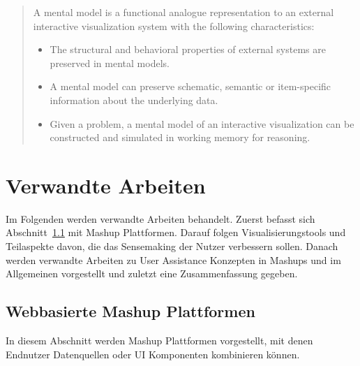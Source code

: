\documentclass[
	headsepline,
	footsepline,
	fontsize=12pt,
	bibliography=totoc
]{scrbook}
\begin{document}
\begin{quote}
A mental model is a functional analogue representation to an external interactive visualization system with the following characteristics:
	\begin{itemize}
		\item The structural and behavioral properties of external systems are preserved in mental models.
		\item A mental model can preserve schematic, semantic or item-specific information about the underlying data.
		\item Given a problem, a mental model of an interactive visualization can be constructed and simulated in working memory for reasoning.
	\end{itemize}
\end{quote}

\section{Verwandte Arbeiten}
\label{section:standderforschung:verwandte_arbeiten}

Im Folgenden werden verwandte Arbeiten behandelt. Zuerst befasst sich Abschnitt~\ref{section:standderforschung:verwandte_arbeiten:mashups} mit Mashup Plattformen. Darauf folgen Visualisierungstools und Teilaspekte davon, die das Sensemaking der Nutzer verbessern sollen. Danach werden verwandte Arbeiten zu User Assistance Konzepten in Mashups und im Allgemeinen vorgestellt und zuletzt eine Zusammenfassung gegeben.

\subsection{Webbasierte Mashup Plattformen}
\label{section:standderforschung:verwandte_arbeiten:mashups}

In diesem Abschnitt werden Mashup Plattformen vorgestellt, mit denen Endnutzer Datenquellen oder UI Komponenten kombinieren können.

\end{document}
